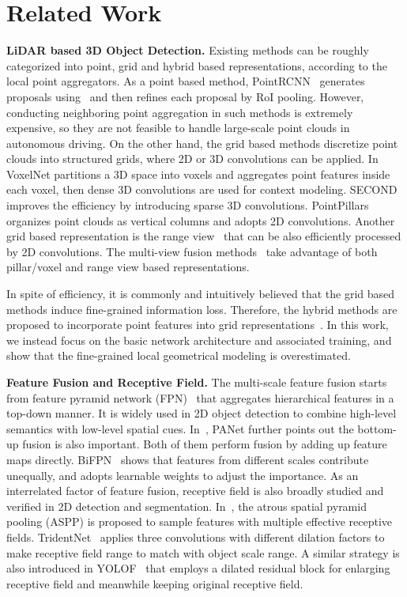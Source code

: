 \documentclass[10pt,twocolumn,letterpaper]{article}
\begin{document}
\section{Related Work}
\noindent\textbf{LiDAR based 3D Object Detection.} 
Existing methods can be roughly categorized into point, grid and hybrid based representations, according to the local point aggregators. As a point based method, PointRCNN~\cite{shi2019pointrcnn} generates proposals using~\cite{qi2017pointnet++} and then refines each proposal by RoI pooling. However, conducting neighboring point aggregation in such methods is extremely expensive, so they are not feasible to handle large-scale point clouds in autonomous driving. On the other hand, the grid based methods discretize point clouds into structured grids, where 2D or 3D convolutions can be applied. In~\cite{zhou2018voxelnet} VoxelNet partitions a 3D space into voxels and aggregates point features inside each voxel, then dense 3D convolutions are used for context modeling. SECOND~\cite{yan2018second} improves the efficiency by introducing sparse 3D convolutions. PointPillars~\cite{lang2019pointpillars} organizes point clouds as vertical columns and adopts 2D convolutions. Another grid based representation is the range view~\cite{meyer2019lasernet} that can be also efficiently processed by 2D convolutions. The multi-view fusion methods~\cite{zhou2020end,wang2020pillar} take advantage of both pillar/voxel and range view based representations. 

In spite of efficiency, it is commonly and intuitively believed that the grid based methods induce fine-grained information loss. Therefore, the hybrid methods are proposed to incorporate point features into grid representations~\cite{liu2021pvnas,shi2021pv}. In this work, we instead focus on the basic network architecture and associated training, and show that the fine-grained local geometrical modeling is overestimated. 


\noindent\textbf{Feature Fusion and Receptive Field.} 
The multi-scale feature fusion starts from feature pyramid network (FPN)~\cite{lin2017feature} that aggregates hierarchical features in a top-down manner. It is widely used in 2D object detection to combine high-level semantics with low-level spatial cues. In~\cite{liu2018path}, PANet further points out the bottom-up fusion is also important. Both of them perform fusion by adding up feature maps directly. BiFPN~\cite{tan2020efficientdet} shows that features from different scales contribute unequally, and adopts learnable weights to adjust the importance. As an interrelated factor of feature fusion, receptive field is also broadly studied and verified in 2D detection and segmentation. In~\cite{Chen_2018_PAMI}, the atrous spatial pyramid pooling (ASPP) is proposed to sample features with multiple effective receptive fields. TridentNet~\cite{Li_2019_ICCV} applies three convolutions with different dilation factors to make receptive field range to match with object scale range. A similar strategy is also introduced in YOLOF~\cite{yolof} that employs a dilated residual block for enlarging receptive field and meanwhile keeping original receptive field. 
\end{document}
